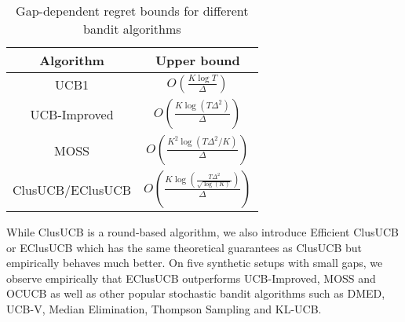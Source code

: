 \begin{table}
\caption{Gap-dependent regret bounds for different bandit algorithms}
\label{tab:regret-bds}
\begin{center}
\begin{tabular}{|c|c|}
\toprule
Algorithm  & Upper bound \\
\midrule
UCB1         &$O\left(\frac{K\log T}{\Delta}\right)$ \\\midrule
UCB-Improved &$O\left(\frac{K\log (T\Delta^{2})}{\Delta}\right)$ \\\midrule
MOSS	     &$O\left(\frac{K^{2}\log\left(T\Delta^{2}/K\right)}{\Delta}\right)$\\\midrule
ClusUCB$\big /$EClusUCB      &$O\left(\frac{K\log\left(\frac{T\Delta^{2}}{\sqrt{\log (K)}}\right)}{\Delta}\right)$\\\bottomrule
\end{tabular}
\end{center}
\end{table}

While ClusUCB is a round-based algorithm, we also introduce Efficient ClusUCB or EClusUCB which has the same theoretical guarantees as ClusUCB but empirically behaves much better. On five synthetic setups with small gaps, we observe empirically that EClusUCB outperforms UCB-Improved\cite{auer2010ucb}, MOSS\cite{audibert2009minimax} and OCUCB\cite{lattimore2015optimally} as well as other popular stochastic bandit algorithms such as DMED\cite{honda2010asymptotically}, UCB-V\cite{audibert2009exploration}, Median Elimination\cite{even2006action}, Thompson Sampling\cite{agrawal2011analysis} and KL-UCB\cite{garivier2011kl}.

